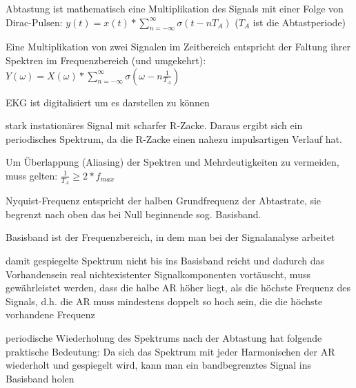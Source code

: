 \documentclass[a4paper]{article}
\begin{document}
\begin{multicols}{3}
  Abtastung ist mathematisch eine Multiplikation des Signals mit einer Folge von Dirac-Pulsen:  $y(t)=x(t)*\sum_{n=-\infty}^{\infty}\sigma(t-nT_A)$ ($T_A$ ist die Abtastperiode)

  Eine Multiplikation von zwei Signalen im Zeitbereich entspricht der Faltung ihrer Spektren im Frequenzbereich (und umgekehrt): $Y(\omega)=X(\omega)*\sum_{n=-\infty}^{\infty} \sigma(\omega-n\frac{1}{T_A})$

  \begin{itemize*}
    \item EKG ist digitalisiert um es darstellen zu können
    \item stark instationäres Signal mit scharfer R-Zacke. Daraus ergibt sich ein periodisches Spektrum, da die R-Zacke einen nahezu impulsartigen Verlauf hat.
    \item Um Überlappung (Aliasing) der Spektren und Mehrdeutigkeiten zu vermeiden, muss gelten: $\frac{1}{T_A}\geq 2*f_{max}$
    \item Nyquist-Frequenz entspricht der halben Grundfrequenz der Abtastrate, sie begrenzt nach oben das bei Null beginnende sog. Basisband.
    \item Basisband ist der Frequenzbereich, in dem man bei der Signalanalyse arbeitet
    \item damit gespiegelte Spektrum nicht bis ins Basisband reicht und dadurch das Vorhandensein real nichtexistenter Signalkomponenten vortäuscht, muss gewährleistet werden, dass die halbe AR höher liegt, als die höchste Frequenz des Signals, d.h. die AR muss mindestens doppelt so hoch sein, die die höchste vorhandene Frequenz
    \item periodische Wiederholung des Spektrums nach der Abtastung hat folgende praktische Bedeutung: Da sich das Spektrum mit jeder Harmonischen der AR wiederholt und gespiegelt wird, kann man ein bandbegrenztes Signal ins Basisband holen
  \end{itemize*}


\end{multicols}
\end{document}
